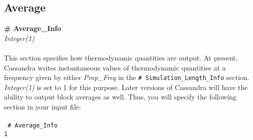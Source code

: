 {{{%
%
%
%
\subsection{Average}\label{sec:Average_Info}
{\bf \# Average\_Info} \\
{\it Integer(1)} \\ \\
%
This section specifies how thermodynamic quantities are output. At present, Cassandra
writes instantaneous values of thermodynamic quantities at a frequency given by
either {\it Prop\_Freq} in the \texttt{\# Simulation\_Length\_Info} section. {\it Integer(1)}
is set to 1 for this purpose. Later versions of Cassandra will have the ability to output block
averages as well. Thus, you will specify the following section in your input file: \\ \\
%
\texttt{
\# Average\_Info \\ 
1}
%
%
}}}

